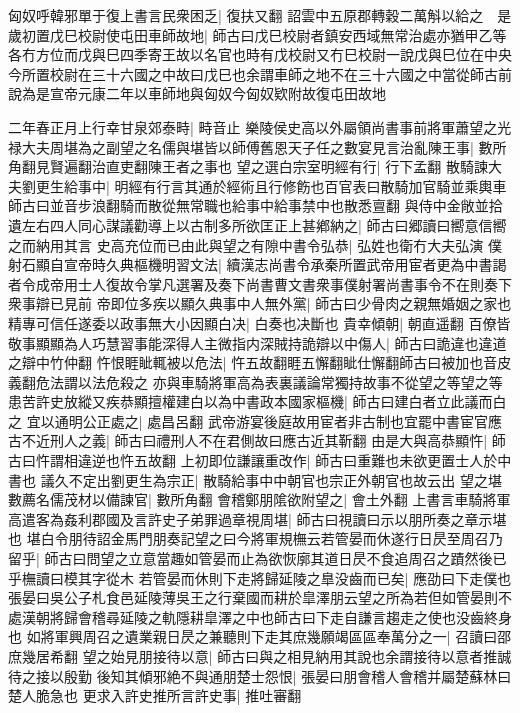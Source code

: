 匈奴呼韓邪單于復上書言民衆困乏|{
	復扶又翻}
詔雲中五原郡轉穀二萬斛以給之　是歲初置戊巳校尉使屯田車師故地|{
	師古曰戊巳校尉者鎮安西域無常治處亦猶甲乙等各冇方位而戊與巳四季寄王故以名官也時有戊校尉又冇巳校尉一說戊與巳位在中央今所置校尉在三十六國之中故曰戊巳也余謂車師之地不在三十六國之中當從師古前說為是宣帝元康二年以車師地與匈奴今匈奴欵附故復屯田故地}


二年春正月上行幸甘泉郊泰畤|{
	畤音止}
樂陵侯史高以外屬領尚書事前將軍蕭望之光禄大夫周堪為之副望之名儒與堪皆以師傅舊恩天子任之數宴見言治亂陳王事|{
	數所角翻見賢遍翻治直吏翻陳王者之事也}
望之選白宗室明經有行|{
	行下孟翻}
散騎諫大夫劉更生給事中|{
	明經有行言其通於經術且行修飭也百官表曰散騎加官騎並乘輿車師古曰並音步浪翻騎而散從無常職也給事中給事禁中也散悉亶翻}
與侍中金敞並拾遺左右四人同心謀議勸導上以古制多所欲匡正上甚鄕納之|{
	師古曰郷讀曰嚮意信嚮之而納用其言}
史高充位而已由此與望之有隙中書令弘恭|{
	弘姓也衛冇大夫弘演}
僕射石顯自宣帝時久典樞機明習文法|{
	續漢志尚書令承秦所置武帝用宦者更為中書謁者令成帝用士人復故令掌凡選署及奏下尚書曹文書衆事僕射署尚書事令不在則奏下衆事辯已見前}
帝即位多疾以顯久典事中人無外黨|{
	師古曰少骨肉之親無婚姻之家也}
精專可信任遂委以政事無大小因顯白决|{
	白奏也决斷也}
貴幸傾朝|{
	朝直遥翻}
百僚皆敬事顯顯為人巧慧習事能深得人主微指内深賊持詭辯以中傷人|{
	師古曰詭違也違道之辯中竹仲翻}
忤恨睚眦輒被以危法|{
	忤五故翻睚五懈翻眦仕懈翻師古曰被加也音皮義翻危法謂以法危殺之}
亦與車騎將軍高為表裏議論常獨持故事不從望之等望之等患苦許史放縱又疾恭顯擅權建白以為中書政本國家樞機|{
	師古曰建白者立此議而白之}
宜以通明公正處之|{
	處昌呂翻}
武帝游宴後庭故用宦者非古制也宜罷中書宦官應古不近刑人之義|{
	師古曰禮刑人不在君側故曰應古近其靳翻}
由是大與高恭顯忤|{
	師古曰忤謂相違逆也忤五故翻}
上初即位謙讓重改作|{
	師古曰重難也未欲更置士人於中書也}
議久不定出劉更生為宗正|{
	散騎給事中中朝官也宗正外朝官也故云出}
望之堪數薦名儒茂材以備諫官|{
	數所角翻}
會稽鄭朋隂欲附望之|{
	會土外翻}
上書言車騎將軍高遣客為姦利郡國及言許史子弟罪過章視周堪|{
	師古曰視讀曰示以朋所奏之章示堪也}
堪白令朋待詔金馬門朋奏記望之曰今將軍規橅云若管晏而休遂行日昃至周召乃留乎|{
	師古曰問望之立意當趣如管晏而止為欲恢廓其道日昃不食追周召之蹟然後已乎橅讀曰模其字從木}
若管晏而休則下走將歸延陵之臯没齒而已矣|{
	應劭曰下走僕也張晏曰吳公子札食邑延陵薄吳王之行棄國而耕於皐澤朋云望之所為若但如管晏則不處漢朝將歸會稽尋延陵之軌隱耕皐澤之中也師古曰下走自謙言趨走之使也没齒終身也}
如將軍興周召之遺業親日昃之兼聽則下走其庶幾願竭區區奉萬分之一|{
	召讀曰邵庶幾居希翻}
望之始見朋接待以意|{
	師古曰與之相見納用其說也余謂接待以意者推誠待之接以殷勤}
後知其傾邪絶不與通朋楚士怨恨|{
	張晏曰朋會稽人會稽并屬楚蘇林曰楚人脆急也}
更求入許史推所言許史事|{
	推吐審翻}
